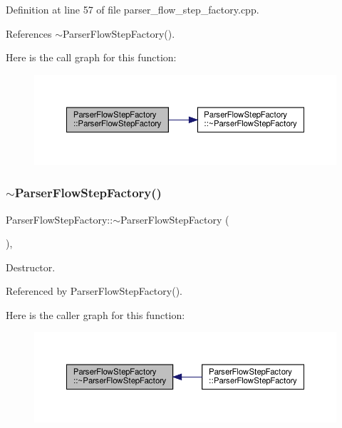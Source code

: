 Definition at line 57 of file parser\+\_\+flow\+\_\+step\+\_\+factory.\+cpp.



References $\sim$\+Parser\+Flow\+Step\+Factory().

Here is the call graph for this function\+:
\nopagebreak
\begin{figure}[H]
\begin{center}
\leavevmode
\includegraphics[width=350pt]{d6/ddc/classParserFlowStepFactory_a65c6ce254962ed217803558733cf14f6_cgraph}
\end{center}
\end{figure}
\mbox{\label{classParserFlowStepFactory_a7bbc091d8b81aed1892f4ce794961431}} 
\subsubsection{\texorpdfstring{$\sim$\+Parser\+Flow\+Step\+Factory()}{~ParserFlowStepFactory()}}
{\footnotesize\ttfamily Parser\+Flow\+Step\+Factory\+::$\sim$\+Parser\+Flow\+Step\+Factory (\begin{DoxyParamCaption}{ }\end{DoxyParamCaption})\hspace{0.3cm}{\ttfamily [override]}, {\ttfamily [default]}}



Destructor. 



Referenced by Parser\+Flow\+Step\+Factory().

Here is the caller graph for this function\+:
\nopagebreak
\begin{figure}[H]
\begin{center}
\leavevmode
\includegraphics[width=350pt]{d6/ddc/classParserFlowStepFactory_a7bbc091d8b81aed1892f4ce794961431_icgraph}
\end{center}
\end{figure}


